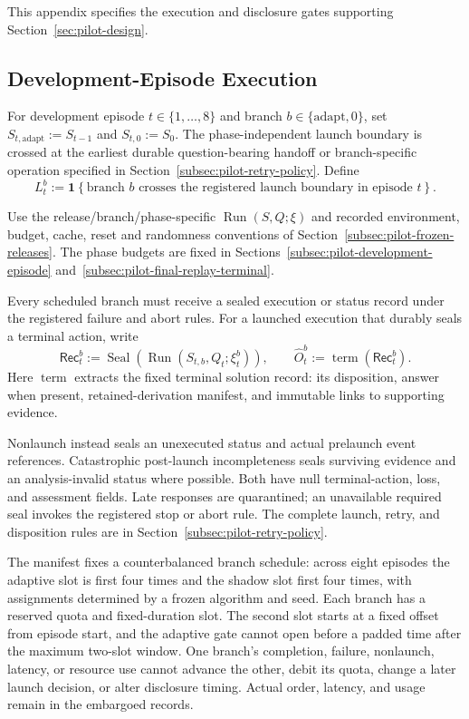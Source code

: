 \documentclass[10pt]{article} %
\providecommand{\1}{\mathbf{1}}  %
\theoremstyle{remark}
\theoremstyle{definition}
\begin{document}
This appendix specifies the execution and disclosure gates supporting
Section~\ref{sec:pilot-design}.

\subsection{Development-Episode Execution}
\label{subsec:execution-development}

For development episode $t\in\{1,\ldots,8\}$ and branch
$b\in\{\mathrm{adapt},0\}$, set
$S_{t,\mathrm{adapt}}:=S_{t-1}$ and $S_{t,0}:=S_0$.
The phase-independent launch boundary is crossed at the earliest
durable question-bearing handoff or branch-specific operation
specified in Section~\ref{subsec:pilot-retry-policy}. Define
\begin{equation}
L_t^b
:=
\mathbf 1\!\left\{
\text{branch $b$ crosses the registered launch boundary in episode $t$}
\right\}.
\end{equation}

Use the release/branch/phase-specific $\operatorname{Run}(S,Q;\xi)$ and
recorded environment, budget, cache, reset and randomness conventions of
Section~\ref{subsec:pilot-frozen-releases}. The phase budgets are fixed in
Sections~\ref{subsec:pilot-development-episode}
and~\ref{subsec:pilot-final-replay-terminal}.

Every scheduled branch must receive a sealed execution or status
record under the registered failure and abort rules. For a launched
execution that durably seals a terminal action, write
\begin{equation}
\mathsf{Rec}_t^b
:=
\operatorname{Seal}\!\left(
\operatorname{Run}(S_{t,b},Q_t;\xi_t^b)
\right),
\qquad
\widehat O_t^b
:=
\operatorname{term}(\mathsf{Rec}_t^b).
\label{eq:appendix-launched-seal}
\end{equation}
Here $\operatorname{term}$ extracts the fixed terminal solution
record: its disposition, answer when present, retained-derivation
manifest, and immutable links to supporting evidence.

Nonlaunch instead seals an unexecuted status and actual prelaunch event
references. Catastrophic post-launch incompleteness seals surviving evidence
and an analysis-invalid status where possible. Both have null terminal-action,
loss, and assessment fields. Late responses are quarantined; an unavailable
required seal invokes the registered stop or abort rule. The complete launch,
retry, and disposition rules are in Section~\ref{subsec:pilot-retry-policy}.

The manifest fixes a counterbalanced branch schedule: across eight episodes
the adaptive slot is first four times and the shadow slot first four times,
with assignments determined by a frozen algorithm and seed. Each branch has
a reserved quota and fixed-duration slot. The second slot starts at a fixed
offset from episode start, and the adaptive gate cannot open before a padded
time after the maximum two-slot window. One branch's completion, failure,
nonlaunch, latency, or resource use cannot advance the other, debit its quota,
change a later launch decision, or alter disclosure timing. Actual order,
latency, and usage remain in the embargoed records.
\end{document}
